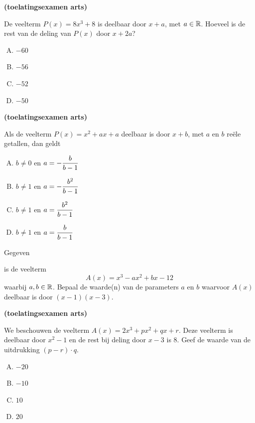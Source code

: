 \documentclass{ximera}
\begin{document}
\begin{exercise} 
\hypertarget{oef3.8}{{\bf (toelatingsexamen arts)}}
De veelterm $P(x) = 8x^3 + 8$ is deelbaar door $x+a$, met $a \in \mathbb{R}$. Hoeveel is de rest van de deling van $P(x)$ door $x+2a$?
\begin{multicols}{4} 
\begin{enumerate}[(A)]
\item 
$-60$ 
\item
$-56$ 
\item
$-52$ 
\item 
$-50$ 
\end{enumerate}
\end{multicols}
\end{exercise} 

\begin{exercise} 
\hypertarget{oef3.9}{{\bf (toelatingsexamen arts)}}
Als de veelterm $P(x) = x^2 + ax + a$ deelbaar is door $x+b$, met $a$ en $b$ re\"ele getallen, dan geldt
\begin{multicols}{2} 
\begin{enumerate}[(A)]
\item 
$b \neq 0$ en $\displaystyle a = -\frac{b}{b-1}$
\item
$b \neq 1$ en $\displaystyle a = -\frac{b^2}{b-1}$
\item
$b \neq 1$ en $\displaystyle a = \frac{b^2}{b-1}$
\item
$b \neq 1$ en $\displaystyle a = \frac{b}{b-1}$
\end{enumerate}
\end{multicols}
\end{exercise} 

\begin{exercise} 
\hypertarget{oef3.10}{Gegeven} is de veelterm
\[
A(x) = x^3 - ax^2 + bx - 12
\]
waarbij $a,b \in \mathbb{R}$. Bepaal de waarde(n) van de parameters $a$ en $b$ waarvoor $A(x)$ deelbaar is door $(x-1)(x-3)$. 
\end{exercise} 

\begin{exercise} 
\hypertarget{oef3.11}{{\bf (toelatingsexamen arts)}}
We beschouwen de veelterm $A(x) = 2x^3 + px^2 + qx + r$. Deze veelterm is deelbaar door $x^2 - 1$ en de rest bij deling door $x-3$ is $8$. Geef de waarde van de uitdrukking $(p-r)\cdot q$.
\begin{multicols}{4} 
\begin{enumerate}[(A)]
\item 
$-20$
\item 
$-10$
\item 
$10$
\item 
$20$
\end{enumerate}
\end{multicols}
\end{exercise} 
\end{document}
